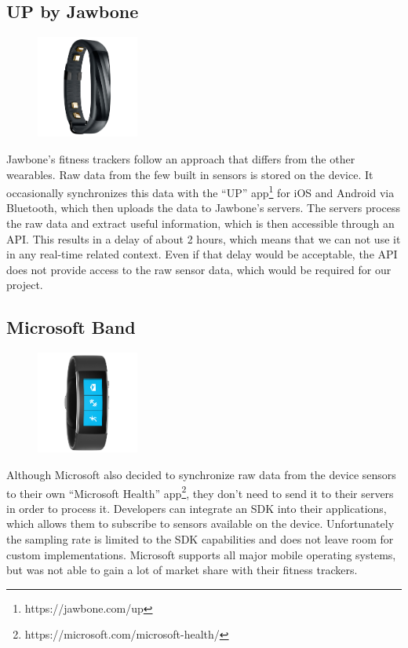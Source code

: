 \subsection{UP by Jawbone}
\begin{figure}
	\begin{center}
		\includegraphics[width=0.3\textwidth]{images/device_up.png}
	\end{center}
\end{figure}
Jawbone's fitness trackers follow an approach that differs from the other wearables.
Raw data from the few built in sensors is stored on the device.
It occasionally synchronizes this data with the ``UP'' app\footnote{https://jawbone.com/up} for iOS and Android via Bluetooth, which then uploads the data to Jawbone's servers.
The servers process the raw data and extract useful information, which is then accessible through an API.
This results in a delay of about 2 hours, which means that we can not use it in any real-time related context.
Even if that delay would be acceptable, the API does not provide access to the raw sensor data, which would be required for our project.

\subsection{Microsoft Band}
\begin{figure}
	\begin{center}
		\includegraphics[width=0.3\textwidth]{images/device_msband.png}
	\end{center}
\end{figure}
Although Microsoft also decided to synchronize raw data from the device sensors to their own ``Microsoft Health'' app\footnote{https://microsoft.com/microsoft-health/}, they don't need to send it to their servers in order to process it.
Developers can integrate an SDK into their applications, which allows them to subscribe to sensors available on the device.
Unfortunately the sampling rate is limited to the SDK capabilities and does not leave room for custom implementations.
Microsoft supports all major mobile operating systems, but was not able to gain a lot of market share with their fitness trackers.

